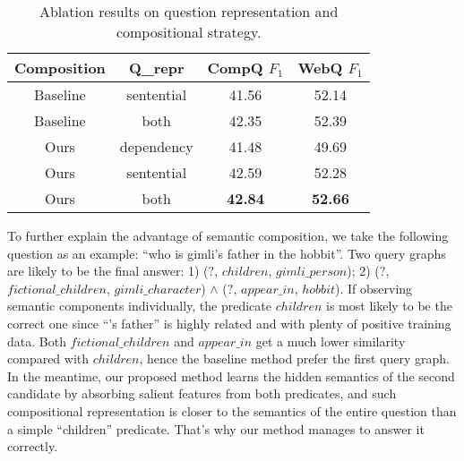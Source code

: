 \begin{table}[ht]
    \small
    \centering
    \begin{tabular} {c|c|c|c}
        \hline
        Composition     & Q\_repr   &   CompQ $F_1$   & WebQ $F_1$ \\
        \hline
        Baseline        &   sentential    &   41.56   & 52.14 \\
        Baseline        &   both          &   42.35   & 52.39 \\
        \hline
        Ours            &   dependency    &   41.48   & 49.69 \\
        Ours            &   sentential    &   42.59   & 52.28 \\
        Ours            &   both          &   \textbf{42.84}   & \textbf{52.66} \\
        \hline
    \end{tabular}
    \caption{Ablation results on question representation and compositional strategy.}
    \label{tab:abl-qw}
\end{table}


To further explain the advantage of semantic composition,
we take the following question as an example:
``who is gimli's father in the hobbit''.
Two query graphs are likely to be the final answer:
1) ($?$, $children$, $gimli\_person$);
2) ($?$, $fictional\_children$, $gimli\_character$) $\wedge$ ($?$, $appear\_in$, $hobbit$).
If observing semantic components individually,
the predicate $children$ is most likely to be the correct one
since ``'s father'' is highly related and with plenty of positive training data.
Both $fictional\_children$ and $appear\_in$ get a much lower similarity compared with $children$,
hence the baseline method prefer the first query graph.
In the meantime, our proposed method learns the hidden semantics of the second candidate 
by absorbing salient features from both predicates,
and such compositional representation is closer to the semantics of the entire question
than a simple ``children'' predicate.
That's why our method manages to answer it correctly.



